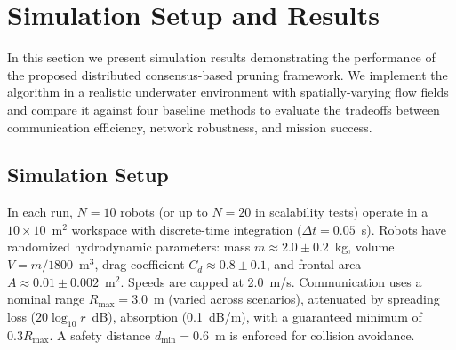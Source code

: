 \documentclass[conference]{IEEEconf}
\theoremstyle{plain}
\begin{document}



\section{Simulation Setup and Results}
\label{sec:results}

In this section we present simulation results demonstrating the performance of the proposed distributed consensus-based pruning framework. We implement the algorithm in a realistic underwater environment with spatially-varying flow fields and compare it against four baseline methods to evaluate the tradeoffs between communication efficiency, network robustness, and mission success.

\subsection{Simulation Setup}

In each run, $N=10$ robots (or up to $N=20$ in scalability tests) operate in a $10 \times 10$~m$^2$ workspace with discrete-time integration ($\Delta t = 0.05$~s). Robots have randomized hydrodynamic parameters: mass $m \approx 2.0 \pm 0.2$~kg, volume $V = m/1800$~m$^3$, drag coefficient $C_d \approx 0.8 \pm 0.1$, and frontal area $A \approx 0.01 \pm 0.002$~m$^2$. Speeds are capped at 2.0~m/s. Communication uses a nominal range $R_{\max} = 3.0$~m (varied across scenarios), attenuated by spreading loss ($20\log_{10}r$~dB), absorption (0.1~dB/m), with a guaranteed minimum of $0.3R_{\max}$. A safety distance $d_{\min} = 0.6$~m is enforced for collision avoidance.
\end{document}
